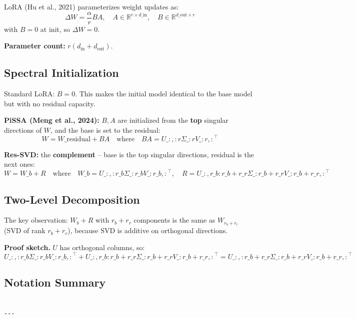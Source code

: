 LoRA (Hu et al., 2021) parameterizes weight updates as:
\[
\Delta W = \frac{\alpha}{r} B A, \quad A \in \mathbb{R}^{r \times d\_\text{in}}, \quad B \in \mathbb{R}^{d\_\text{out} \times r}
\tag{3.2}
\]
with $B = 0$ at init, so $\Delta W = 0$.

\textbf{Parameter count:} $r(d_\text{in} + d_\text{out})$.

\subsection{Spectral Initialization}

Standard LoRA: $B = 0$. This makes the initial model identical to the 
base model but with no residual capacity.

\textbf{PiSSA (Meng et al., 2024):} $B, A$ are initialized from the \textbf{top} 
singular directions of $W$, and the base is set to the residual:
\[
W = W\_\text{residual} + B A \quad \text{where} \quad B A = U\_{:, :r} \Sigma\_{:r} V\_{:r, :}^\top
\tag{3.3}
\]

\textbf{Res-SVD:} the \textbf{complement} -- base is the top singular directions, 
residual is the next ones:
\[
W = W\_b + R \quad \text{where} \quad W\_b = U\_{:, :r\_b} \Sigma\_{:r\_b} V\_{:r\_b, :}^\top, \quad R = U\_{:, r\_b:r\_b+r\_r} \Sigma\_{:r\_b+r\_r} V\_{:r\_b+r\_r, :}^\top
\tag{3.4}
\]

\subsection{Two-Level Decomposition}

The key observation: $W_b + R$ with $r_b + r_r$ components is the same as 
$W_{r_b + r_r}$ (SVD of rank $r_b + r_r$), because SVD is additive on 
orthogonal directions.

\textbf{Proof sketch.} $U$ has orthogonal columns, so:
\[
U\_{:, :r\_b} \Sigma\_{:r\_b} V\_{:r\_b, :}^\top + U\_{:, r\_b:r\_b+r\_r} \Sigma\_{:r\_b+r\_r} V\_{:r\_b+r\_r, :}^\top = U\_{:, :r\_b+r\_r} \Sigma\_{:r\_b+r\_r} V\_{:r\_b+r\_r, :}^\top
\tag{3.5}
\]

\subsection{Notation Summary}

\begin{lstlisting}

---
\end{lstlisting}

